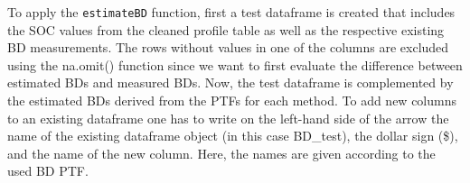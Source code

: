 \documentclass[
  10pt,
  b5paper,
  oneside]{book}
\newenvironment{Shaded}{\begin{snugshade}}{\end{snugshade}}
\newcommand{\AttributeTok}[1]{\textcolor[rgb]{0.77,0.63,0.00}{#1}}
\newcommand{\CommentTok}[1]{\textcolor[rgb]{0.56,0.35,0.01}{\textit{#1}}}
\newcommand{\ControlFlowTok}[1]{\textcolor[rgb]{0.13,0.29,0.53}{\textbf{#1}}}
\newcommand{\DocumentationTok}[1]{\textcolor[rgb]{0.56,0.35,0.01}{\textbf{\textit{#1}}}}
\newcommand{\FunctionTok}[1]{\textcolor[rgb]{0.00,0.00,0.00}{#1}}
\newcommand{\NormalTok}[1]{#1}
\newcommand{\OtherTok}[1]{\textcolor[rgb]{0.56,0.35,0.01}{#1}}
\newcommand{\SpecialCharTok}[1]{\textcolor[rgb]{0.00,0.00,0.00}{#1}}
\begin{document}
To apply the \texttt{estimateBD} function, first a test dataframe is created that includes the SOC values from the cleaned profile table as well as the respective existing BD measurements. The rows without values in one of the columns are excluded using the na.omit() function since we want to first evaluate the difference between estimated BDs and measured BDs.
Now, the test dataframe is complemented by the estimated BDs derived from the PTFs for each method. To add new columns to an existing dataframe one has to write on the left-hand side of the arrow the name of the existing dataframe object (in this case BD\_test), the dollar sign (\$), and the name of the new column. Here, the names are given according to the used BD PTF.

\begin{Shaded}
\end{Shaded}
\end{document}
